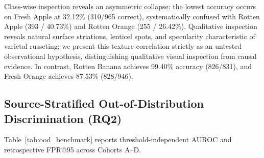 Class-wise inspection reveals an asymmetric collapse: the lowest accuracy occurs on Fresh Apple at 32.12\% (310/965 correct), systematically confused with Rotten Apple (393 / 40.73\%) and Rotten Orange (255 / 26.42\%). Qualitative inspection reveals natural surface striations, lenticel spots, and specularity characteristic of varietal russeting; we present this texture correlation strictly as an untested observational hypothesis, distinguishing qualitative visual inspection from causal evidence. In contrast, Rotten Banana achieves 99.40\% accuracy (826/831), and Fresh Orange achieves 87.53\% (828/946).

\subsection{Source-Stratified Out-of-Distribution Discrimination (RQ2)}
Table~\ref{tab:ood_benchmark} reports threshold-independent AUROC and retrospective FPR@95 across Cohorts A--D.

